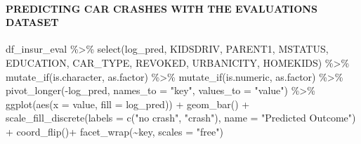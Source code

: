 \documentclass[
]{article}
\newenvironment{Shaded}{\begin{snugshade}}{\end{snugshade}}
\newcommand{\AttributeTok}[1]{\textcolor[rgb]{0.77,0.63,0.00}{#1}}
\newcommand{\DecValTok}[1]{\textcolor[rgb]{0.00,0.00,0.81}{#1}}
\newcommand{\FloatTok}[1]{\textcolor[rgb]{0.00,0.00,0.81}{#1}}
\newcommand{\FunctionTok}[1]{\textcolor[rgb]{0.00,0.00,0.00}{#1}}
\newcommand{\NormalTok}[1]{#1}
\newcommand{\OtherTok}[1]{\textcolor[rgb]{0.56,0.35,0.01}{#1}}
\newcommand{\SpecialCharTok}[1]{\textcolor[rgb]{0.00,0.00,0.00}{#1}}
\newcommand{\StringTok}[1]{\textcolor[rgb]{0.31,0.60,0.02}{#1}}
\begin{document}
\hypertarget{predicting-car-crashes-with-the-evaluations-dataset}{%
\paragraph{PREDICTING CAR CRASHES WITH THE EVALUATIONS
DATASET}\label{predicting-car-crashes-with-the-evaluations-dataset}}

\begin{Shaded}
\end{Shaded}

\begin{Shaded}
\begin{Highlighting}[]
\NormalTok{df\_insur\_eval }\SpecialCharTok{\%\textgreater{}\%} 
  \FunctionTok{select}\NormalTok{(log\_pred, KIDSDRIV, PARENT1, MSTATUS, EDUCATION, CAR\_TYPE,}
\NormalTok{         REVOKED, URBANICITY, HOMEKIDS) }\SpecialCharTok{\%\textgreater{}\%} 
  \FunctionTok{mutate\_if}\NormalTok{(is.character, as.factor) }\SpecialCharTok{\%\textgreater{}\%} 
  \FunctionTok{mutate\_if}\NormalTok{(is.numeric, as.factor) }\SpecialCharTok{\%\textgreater{}\%} 
  \FunctionTok{pivot\_longer}\NormalTok{(}\SpecialCharTok{{-}}\NormalTok{log\_pred, }\AttributeTok{names\_to =} \StringTok{"key"}\NormalTok{, }\AttributeTok{values\_to =} \StringTok{"value"}\NormalTok{) }\SpecialCharTok{\%\textgreater{}\%} 
  \FunctionTok{ggplot}\NormalTok{(}\FunctionTok{aes}\NormalTok{(}\AttributeTok{x =}\NormalTok{ value, }\AttributeTok{fill =}\NormalTok{ log\_pred)) }\SpecialCharTok{+} 
  \FunctionTok{geom\_bar}\NormalTok{() }\SpecialCharTok{+} 
  \FunctionTok{scale\_fill\_discrete}\NormalTok{(}\AttributeTok{labels =} \FunctionTok{c}\NormalTok{(}\StringTok{"no crash"}\NormalTok{, }\StringTok{"crash"}\NormalTok{),}
                      \AttributeTok{name =} \StringTok{"Predicted Outcome"}\NormalTok{) }\SpecialCharTok{+}
  \FunctionTok{coord\_flip}\NormalTok{()}\SpecialCharTok{+}
  \FunctionTok{facet\_wrap}\NormalTok{(}\SpecialCharTok{\textasciitilde{}}\NormalTok{key, }\AttributeTok{scales =} \StringTok{"free"}\NormalTok{)}
\end{Highlighting}
\end{Shaded}
\end{document}
